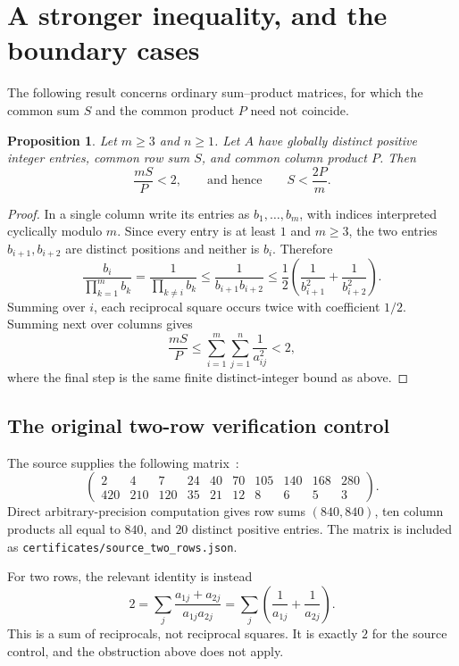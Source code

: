 \documentclass[11pt]{article}
\newtheorem{proposition}[theorem]{Proposition}
\begin{document}
\newpage
\section{A stronger inequality, and the boundary cases}
The following result concerns ordinary sum--product matrices, for which the
common sum $S$ and the common product $P$ need not coincide.

\begin{proposition}\label{prop:strong}
Let $m\ge3$ and $n\ge1$. Let $A$ have globally distinct positive integer
entries, common row sum $S$, and common column product $P$. Then
\[
\frac{mS}{P}<2,\qquad\text{and hence}\qquad S<\frac{2P}{m}.
\]
\end{proposition}
\begin{proof}
In a single column write its entries as $b_1,\ldots,b_m$, with indices
interpreted cyclically modulo $m$. Since every entry is at least $1$ and
$m\ge3$, the two entries $b_{i+1},b_{i+2}$ are distinct positions and neither
is $b_i$. Therefore
\[
\frac{b_i}{\prod_{k=1}^{m}b_k}
=\frac1{\prod_{k\ne i}b_k}
\le\frac1{b_{i+1}b_{i+2}}
\le\frac12\left(\frac1{b_{i+1}^{2}}+\frac1{b_{i+2}^{2}}\right).
\]
Summing over $i$, each reciprocal square occurs twice with coefficient $1/2$.
Summing next over columns gives
\[
\frac{mS}{P}\le\sum_{i=1}^{m}\sum_{j=1}^{n}\frac1{a_{ij}^2}<2,
\]
where the final step is the same finite distinct-integer bound as above.
\end{proof}

\subsection*{The original two-row verification control}
The source supplies the following matrix~\cite{friedman}:
\[
\begin{pmatrix}
2&4&7&24&40&70&105&140&168&280\\
420&210&120&35&21&12&8&6&5&3
\end{pmatrix}.
\]
Direct arbitrary-precision computation gives row sums $(840,840)$, ten column
products all equal to $840$, and $20$ distinct positive entries. The matrix
is included as \texttt{certificates/source\_two\_rows.json}.

For two rows, the relevant identity is instead
\[
2=\sum_j\frac{a_{1j}+a_{2j}}{a_{1j}a_{2j}}
=\sum_j\left(\frac1{a_{1j}}+\frac1{a_{2j}}\right).
\]
This is a sum of reciprocals, not reciprocal squares. It is exactly $2$ for
the source control, and the obstruction above does not apply.
\end{document}
